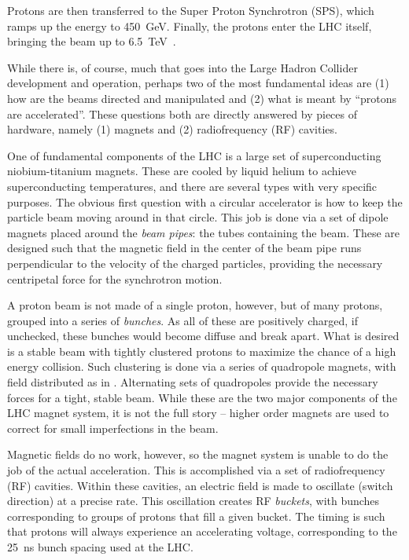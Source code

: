 Protons are then transferred to the Super Proton Synchrotron (SPS), which ramps up the energy to 
\SI{450}{\GeV}. Finally, the protons enter the LHC itself, bringing the beam up to \SI{6.5}{\TeV}~\cite{accelerator}.

While there is, of course, much that goes into the Large Hadron Collider development and operation, perhaps
two of the most fundamental ideas are (1) how are the beams directed and manipulated and (2) what is 
meant by ``protons are accelerated''. These questions both are directly answered by pieces of hardware,
namely (1) magnets and (2) radiofrequency (RF) cavities.

One of fundamental components of the LHC is a large set of superconducting niobium-titanium magnets. These 
are cooled by liquid helium to achieve superconducting temperatures, and there are several types with very 
specific purposes. The obvious first question with a circular accelerator is how to keep the particle beam 
moving around in that circle. This job is done via a set of dipole magnets placed around the \emph{beam pipes}: the 
tubes containing the beam. These are designed such that the magnetic field in the center of the beam pipe runs 
perpendicular to the velocity of the charged particles, providing the necessary centripetal force for 
the synchrotron motion.

A proton beam is not made of a single proton, however, but of many protons, grouped into a series of \emph{bunches}.
As all of these are positively charged, if unchecked, these bunches would become diffuse and break apart. What is 
desired is a stable beam with tightly clustered protons to maximize the chance of a high energy collision.
Such clustering is done via a series of quadropole magnets, with field distributed as in 
. Alternating sets of quadropoles provide the necessary forces for a tight, 
stable beam. While these are the two major components of the LHC magnet system, it is not the full story -- higher order 
magnets are used to correct for small imperfections in the beam.

Magnetic fields do no work, however, so the magnet system is unable to do the job of the actual acceleration. This is 
accomplished via a set of radiofrequency (RF) cavities. Within these cavities, an electric field is made to 
oscillate (switch direction) at a precise rate. This oscillation creates RF \emph{buckets}, with 
bunches corresponding to groups of protons that fill a given bucket. The timing is such that protons will always 
experience an accelerating voltage, corresponding to the \SI{25}{\ns} bunch spacing used at the LHC.

